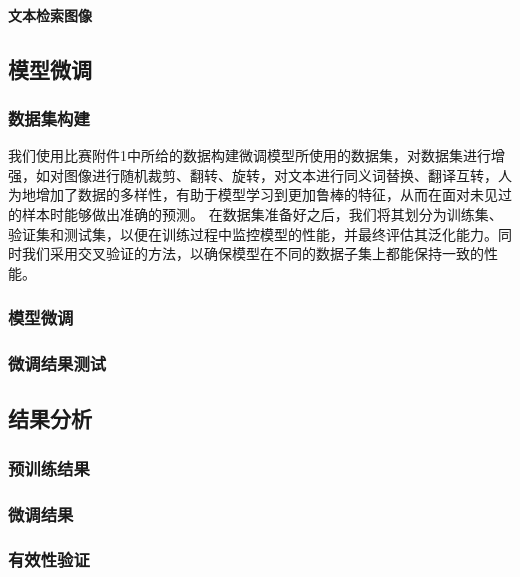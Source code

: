 \documentclass[a4paper]{zreport}
\begin{document}
\paragraph{文本检索图像}



\subsection{模型微调}

\subsubsection{数据集构建}
我们使用比赛附件1中所给的数据构建微调模型所使用的数据集，对数据集进行增强，如对图像进行随机裁剪、翻转、旋转，对文本进行同义词替换、翻译互转，人为地增加了数据的多样性，有助于模型学习到更加鲁棒的特征，从而在面对未见过的样本时能够做出准确的预测。
在数据集准备好之后，我们将其划分为训练集、验证集和测试集，以便在训练过程中监控模型的性能，并最终评估其泛化能力。同时我们采用交叉验证的方法，以确保模型在不同的数据子集上都能保持一致的性能。
\subsubsection{模型微调}

\subsubsection{微调结果测试}




\subsection{结果分析}

\subsubsection{预训练结果}

\subsubsection{微调结果}

\subsubsection{有效性验证}


\cite{*}

\newpage




\end{document}
